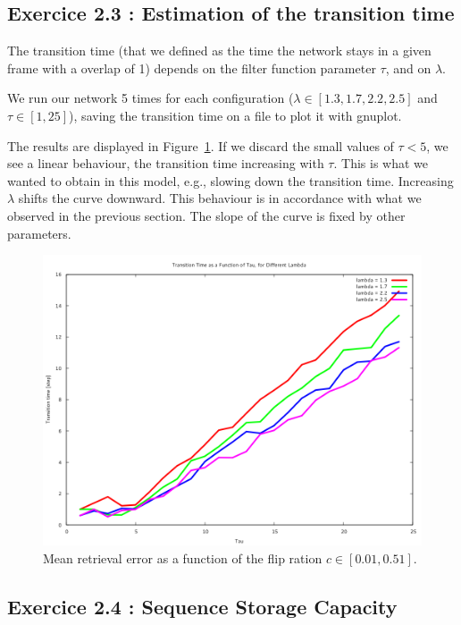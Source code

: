 \subsection{Exercice 2.3 : Estimation of the transition time}
The transition time (that we defined as the time the network stays in a given frame with a overlap of 1) depends on the filter function parameter $\tau$, and on $\lambda$.

We run our network 5 times for each configuration ($\lambda \in [1.3, 1.7, 2.2, 2.5]$ and 
$\tau \in [1, 25]$), saving the transition time on a file to plot it with gnuplot. 

The results
are displayed in Figure~\ref{transtime}. If we discard the small values of $\tau < 5$, we
see a linear behaviour, the transition time increasing with $\tau$. This is what we wanted to obtain in this model, e.g., slowing down the transition time. Increasing $\lambda$ shifts the curve downward. This behaviour is in accordance with what we observed in the previous section.  
The slope of the curve is fixed by other parameters.
\begin{figure}\label{transtime}
    \begin{center}
    \caption{Mean retrieval error as a function of the flip ration $c\in[0.01, 0.51]$.  }
    \includegraphics[scale=0.5]{img/ex23.png}
    \end{center}
\end{figure}


\subsection{Exercice 2.4 : Sequence Storage Capacity}

